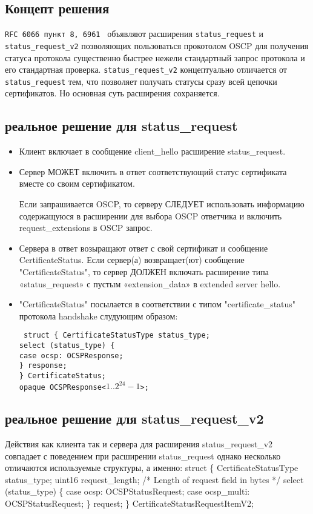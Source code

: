 \subsection{Концепт решения}
\texttt{RFC 6066 пункт 8, 6961 } объявляют расширения \texttt{status\_request} и \texttt{status\_request\_v2} позволяющих пользоваться прокотолом OSCP для получения статуса протокола существенно быстрее нежели стандартный запрос протокола и его стандартная проверка. \texttt{status\_request\_v2} концептуально отличается от \texttt{status\_request} тем, что позволяет получать статусы сразу всей цепочки сертификатов. Но основная суть расширения сохраняется.


\subsection{реальное решение для status\_request}
\begin{itemize}
	\item Клиент включает в сообщение client\_hello расширение status\_request.
	\item Сервер МОЖЕТ включить в ответ соответствующий статус сертификата вместе со своим сертификатом.
	
	Если запрашивается OSCP, то серверу СЛЕДУЕТ использовать информацию содержащуюся в расширении для выбора OSCP ответчика и включить request\_extensions в OSCP запрос. 
	\item Сервера в ответ возыращают ответ с свой сертификат и сообщение CertificateStatus. Если сервер(а) возвращает(ют)
	сообщение "CertificateStatus", то сервер ДОЛЖЕН включать
	расширение типа «status\_request» с пустым «extension\_data» в
	extended server hello.
	\item "CertificateStatus" посылается в соответствии с типом "certificate\_status" протокола handshake слудующим образом: 
	
	\texttt{      struct \{
		CertificateStatusType status\_type;\\
		select (status\_type) \{\\
		case ocsp: OCSPResponse;\\
		\} response;\\
		\} CertificateStatus;\\		
		opaque OCSPResponse<$1..2^{24}-1$>;}
	
	
\end{itemize}

\subsection{реальное решение для status\_request\_v2}
Действия как клиента так и сервера для расширения status\_request\_v2 совпадает с поведением при расширении status\_request однако несколько отличаются используемые структуры, а именно:
 struct \{
CertificateStatusType status\_type;
uint16 request\_length; /* Length of request field in bytes */
select (status\_type) \{
case ocsp: OCSPStatusRequest;
case ocsp\_multi: OCSPStatusRequest;
\} request;
\} CertificateStatusRequestItemV2;

